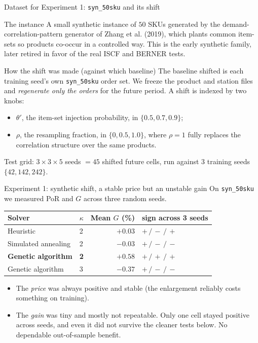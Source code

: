 \documentclass[11pt,aspectratio=169]{beamer}
\newcommand{\gt}[1]{\textcolor{good}{#1}}
\begin{document}
\begin{frame}{Dataset for Experiment 1: \texttt{syn\_50sku} and its shift}
  \begin{block}{The instance}
  A small synthetic instance of $50$ SKUs generated by the demand-correlation-pattern generator of Zhang et al. (2019), which plants common item-sets so products co-occur in a controlled way. This is the early synthetic family, later retired in favor of the real ISCF and BERNER tests.
  \end{block}
  \begin{block}{How the shift was made (against which baseline)}
  The baseline shifted is each training seed's own \texttt{syn\_50sku} order set. We freeze the product and station files and \emph{regenerate only the orders} for the future period. A shift is indexed by two knobs:
  \begin{itemize}
    \item $\theta'$, the item-set injection probability, in $\{0.5, 0.7, 0.9\}$;
    \item $\rho$, the resampling fraction, in $\{0, 0.5, 1.0\}$, where $\rho=1$ fully replaces the correlation structure over the same products.
  \end{itemize}
  Test grid: $3 \times 3 \times 5$ seeds $=45$ shifted future cells, run against $3$ training seeds $\{42,142,242\}$.
  \end{block}
\end{frame}

\begin{frame}{Experiment 1: synthetic shift, a stable price but an unstable gain}
  On \texttt{syn\_50sku} we measured PoR and $G$ across three random seeds.
  \begin{table}\centering\small
  \begin{tabular}{@{}llrl@{}}
  \toprule
  Solver & $\kappa$ & Mean $G$ (\%) & sign across 3 seeds\\
  \midrule
  Heuristic & 2 & $+0.03$ & $+\,/\,-\,/\,+$\\
  Simulated annealing & 2 & $-0.03$ & $+\,/\,-\,/\,-$\\
  \textbf{Genetic algorithm} & \textbf{2} & \gt{$+0.58$} & $+\,/\,+\,/\,+$\\
  Genetic algorithm & 3 & $-0.37$ & $+\,/\,-\,/\,-$\\
  \bottomrule
  \end{tabular}
  \end{table}
  \begin{itemize}
    \item The \emph{price} was always positive and stable (the enlargement reliably costs something on training).
    \item The \emph{gain} was tiny and mostly not repeatable. Only one cell stayed positive across seeds, and even it did not survive the cleaner tests below. No dependable out-of-sample benefit.
  \end{itemize}
\end{frame}
\end{document}
